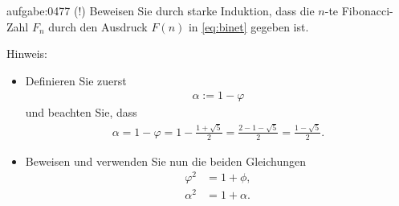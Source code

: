 \clearpage
\begin{aufgabe}{aufgabe:0477}
(!) Beweisen Sie durch starke Induktion, dass die $n$-te Fibonacci-Zahl $F_n$ durch den Ausdruck $F(n)$ in \cref{eq:binet} gegeben ist. 

\noindent
Hinweis:
\begin{itemize}
    \item Definieren Sie zuerst
    \begin{align*}
        \alpha := 1-\varphi
    \end{align*}
    und beachten Sie, dass
    \begin{align*}
        \alpha = 1-\varphi = 1 - \frac{1+\sqrt{5}}{2} = \frac{2 - 1 - \sqrt{5}}{2} =  \frac{1-\sqrt{5}}{2}.
    \end{align*}
    \item Beweisen und verwenden Sie nun die beiden Gleichungen
    \begin{align*}
        \varphi^2 &= 1+\phi,\\
        \alpha^2 &= 1+\alpha.
    \end{align*}
\end{itemize}
\end{aufgabe}


